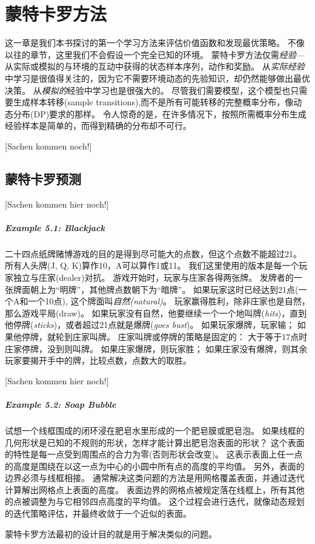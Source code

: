 \chapter{蒙特卡罗方法}
这一章是我们本书探讨的第一个学习方法来评估价值函数和发现最优策略。
不像以往的章节，这里我们不会假设一个完全已知的环境。
蒙特卡罗方法仅需\textit{经验}---从实际或模拟的与环境的互动中获得的状态样本序列，动作和奖励。
从\textit{实际经验}中学习是很值得关注的，因为它不需要环境动态的先验知识，却仍然能够做出最优决策。
从\textit{模拟的}经验中学习也是很强大的。
尽管我们需要模型，这个模型也只需要生成样本转移(sample transitions),而不是所有可能转移的完整概率分布，像动态分布(DP)要求的那样。
令人惊奇的是，在许多情况下，按照所需概率分布生成经验样本是简单的，而得到精确的分布却不可行。

[Sachen kommen noch!]


\section{蒙特卡罗预测}
[Sachen kommen hier noch!]
\paragraph{Example 5.1: Blackjack} 
二十四点纸牌赌博游戏的目的是得到尽可能大的点数，但这个点数不能超过21。
所有人头牌(J, Q, K)算作10，A可以算作1或11。
我们这里使用的版本是每一个玩家独立与庄家(dealer)对抗。
游戏开始时，玩家与庄家各得两张牌。
发牌者的一张牌面朝上为“明牌”，其他牌点数朝下为“暗牌”。
如果玩家这时已经达到21点(一个A和一个10点), 这个牌面叫\textit{自然(natural)}。
玩家赢得胜利，除非庄家也是自然，那么游戏平局(draw)。
如果玩家没有自然，他要继续一个一个地叫牌(\textit{hits})，直到他停牌(\textit{sticks})，或者超过21点就是爆牌(\textit{goes bust})。
如果玩家爆牌，玩家输；
如果他停牌，就轮到庄家叫牌。
庄家叫牌或停牌的策略是固定的：
大于等于17点时庄家停牌，没到则叫牌。
如果庄家爆牌，则玩家胜；
如果庄家没有爆牌，则其余玩家要揭开手中的牌，比较点数，点数大的取胜。

[Sachen kommen hier noch!]

\paragraph{Example 5.2: Soap Bubble}
试想一个线框围成的闭环浸在肥皂水里形成的一个肥皂膜或肥皂泡。
如果线框的几何形状是已知的不规则的形状，怎样才能计算出肥皂泡表面的形状？
这个表面的特性是每一点受到周围点的合力为零(否则形状会改变)。
这表示表面上任一点的高度是围绕在以这一点为中心的小圆中所有点的高度的平均值。
另外，表面的边界必须与线框相接。
通常解决这类问题的方法是用网格覆盖表面，并通过迭代计算解出网格点上表面的高度。 
表面边界的网格点被规定落在线框上，所有其他的点被调整为与它相邻四点高度的平均值。
这个过程会进行迭代，就像动态规划的迭代策略评估，并最终收敛于一个近似的表面。

蒙特卡罗方法最初的设计目的就是用于解决类似的问题。

